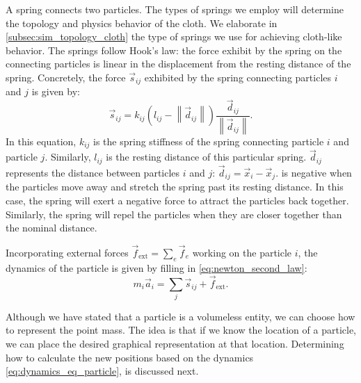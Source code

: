 \documentclass[\home/main.tex]{subfiles}
\begin{document}
A spring connects two particles. The types of springs we employ will determine the topology and physics behavior of the cloth. We elaborate in \cref{subsec:sim_topology_cloth} the type of springs we use for achieving cloth-like behavior. The springs follow Hook's law: the force exhibit by the spring on the connecting particles is linear in the displacement from the resting distance of the spring. Concretely, the force $\vec{s}_{ij}$ exhibited by the spring connecting particles $i$ and $j$ is given by:
\begin{equation}\label{eq:hook_spring}
    \vec{s}_{ij}=k_{i j}\left(l_{i j}-\left\|\vec{d}_{ij}\right\|\right) \frac{\vec{d}_{ij}}{\left\|\vec{d}_{ij}\right\|}.
\end{equation}
In this equation, $k_{ij}$ is the spring stiffness of the spring connecting particle $i$ and particle $j$. Similarly, $l_{ij}$ is the resting distance of this particular spring. $\vec{d}_{ij}$ represents the distance between particles $i$ and $j$: $\vec{d}_{ij} = \vec{x}_i - \vec{x}_j$.  is negative when the particles move away and stretch the spring past its resting distance. In this case, the spring will exert a negative force to attract the particles back together. Similarly, the spring will repel the particles when they are closer together than the nominal distance. 

Incorporating external forces $\vec{f}_{\text{ext}} = \sum_e \vec{f}_e$ working on the particle $i$, the dynamics of the particle is given by filling in \cref{eq:newton_second_law}:
\begin{equation} \label{eq:dynamics_eq_particle}
    m_i \vec{a}_i = \sum_j \vec{s}_{ij} + \vec{f}_{\text{ext}}.
\end{equation}

Although we have stated that a particle is a volumeless entity, we can choose how to represent the point mass. The idea is that if we know the location of a particle, we can place the desired graphical representation at that location. Determining how to calculate the new positions based on the dynamics \cref{eq:dynamics_eq_particle}, is discussed next.
\end{document}
